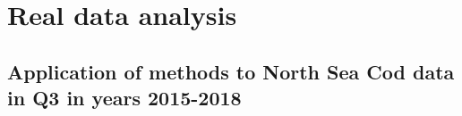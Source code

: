 \documentclass[a4paper 12pt]{article}
\numberwithin{equation}{section}
\begin{document}
%
%
%
% 

 
 
\clearpage


 \section{Real data analysis}
\label{secAP:realdataanalysis}

\subsection{Application of methods to North Sea Cod data in Q3 in years 2015-2018}
\label{secAp:applicationToCodData}
\end{document}
